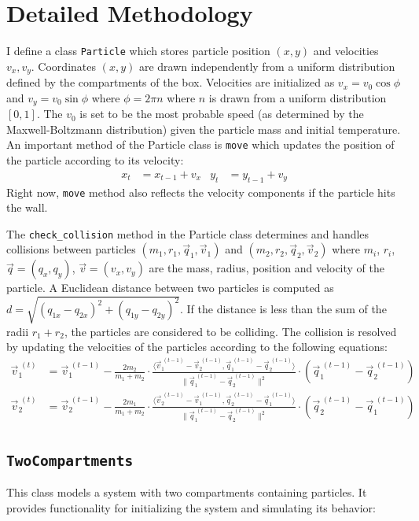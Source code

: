 \documentclass[10pt]{article}
\begin{document}
\section{Detailed Methodology}
\label{sec:methods-detailed}
I define a class \texttt{Particle} which stores particle position $(x,y)$ and velocities $v_x,v_y$. Coordinates $(x,y)$ are drawn independently from a uniform distribution defined by the compartments of the box. Velocities are initialized as $v_x=v_0 \cos \phi$ and $v_y=v_0 \sin \phi$ where $\phi=2\pi n$ where $n$ is drawn from a uniform distribution $[0,1]$. The $v_0$ is set to be the most probable speed (as determined by the Maxwell-Boltzmann distribution) given the particle mass and initial temperature. An important method of the Particle class is \texttt{move} which updates the position of the particle according to its velocity:
\begin{align}
    x_t &= x_{t-1} + v_x & y_t &= y_{t-1} + v_y
\end{align}
Right now, \texttt{move} method also reflects the velocity components if the particle hits the wall.

The \texttt{check\_collision} method in the Particle class determines and handles collisions between particles $(m_1, r_1, \vec{q}_1, \vec{v}_1)$ and $(m_2, r_2, \vec{q}_2, \vec{v}_2)$ where $m_i$, $r_i$, $\vec{q}=(q_x, q_y)$, $\vec{v}=(v_x,v_y)$ are the mass, radius, position and velocity of the particle. A Euclidean distance between two particles is computed as $d=\sqrt{(q_{1x}-q_{2x})^2+(q_{1y}-q_{2y})^2}$. If the distance is less than the sum of the radii $r_1+r_2$, the particles are considered to be colliding. The collision is resolved by updating the velocities of the particles according to the following equations:
\begin{align}
\vec{v}_1^{\;(t)} &= \vec{v}_1^{\;(t-1)} - \frac{2  m_2}{m_1+m_2} \cdot \frac{\langle \vec{v}_1^{\;(t-1)} - \vec{v}_2^{\;(t-1)}, \vec{q}_1^{\;(t-1)} - \vec{q}_2^{\;(t-1)} \rangle}{\| \vec{q}_1^{\;(t-1)} - \vec{q}_2^{\;(t-1)} \|^2} \cdot (\vec{q}_1^{\;(t-1)} - \vec{q}_2^{\;(t-1)}) \\
\vec{v}_2^{\;(t)} &= \vec{v}_2^{\; (t-1)} - \frac{2  m_1}{m_1+m_2} \cdot \frac{\langle \vec{v}_2^{\;(t-1)} - \vec{v}_1^{\;(t-1)}, \vec{q}_2^{\;(t-1)} - \vec{q}_1^{\;(t-1)} \rangle}{\| \vec{q}_1^{\;(t-1)} - \vec{q}_2^{\;(t-1)} \|^2} \cdot (\vec{q}_2^{\;(t-1)} - \vec{q}_1^{\;(t-1)})
\end{align}

\subsection*{\texttt{TwoCompartments}}
This class models a system with two compartments containing particles. It provides functionality for initializing the system and simulating its behavior:
\end{document}
